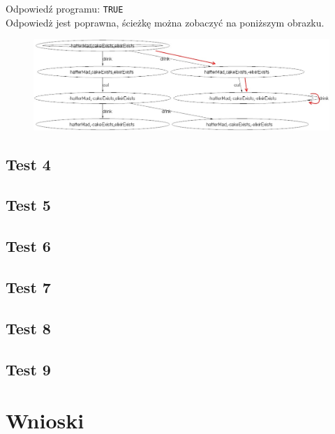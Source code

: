 \documentclass{article}
\begin{document}
\begin{itemize}
    Odpowiedź programu: \texttt{TRUE}\\
    Odpowiedż jest poprawna, ścieżkę można zobaczyć na poniższym obrazku.
    \begin{figure}[H]
    \centering
    \includegraphics[scale=0.5]{test3_5}
    \end{figure}
    
    
\end{itemize}

\newpage
\subsection{Test 4}
\newpage
\subsection{Test 5}
\newpage
\subsection{Test 6}
\newpage
\subsection{Test 7}
\newpage
\subsection{Test 8}
\newpage
\subsection{Test 9}
\newpage
\section{Wnioski}
\end{document}
